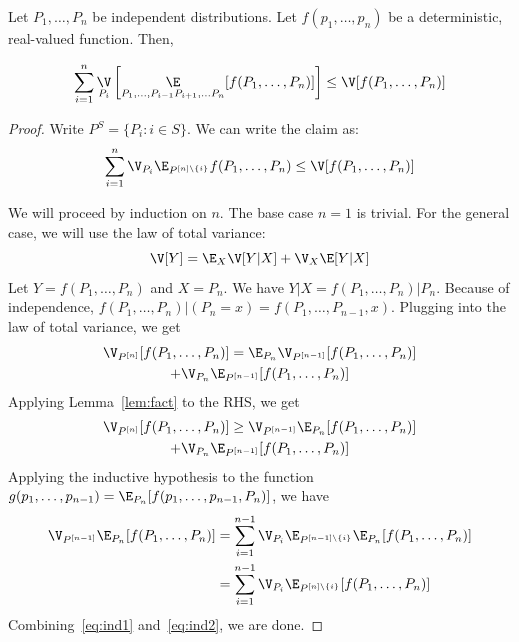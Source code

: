 \begin{lemma}\label{lem:variance-sum}
Let $P_1, \ldots, P_n$ be independent distributions. Let $f(p_1, \ldots, p_n)$
be a deterministic, real-valued function. Then, 

\[
    \sum_{i=1}^n \mathop{\V}_{P_i}\left[ \mathop{\E}_{P_1, \ldots, P_{i-1} P_{i+1}, \ldots P_n} [f(P_1,\ldots, P_n)] \right] \leq \V[f(P_1,\ldots, P_n)]
\]
\end{lemma}
\begin{proof}
Write $P^{S} = \{ P_i : i \in S\}$. We can write the claim as:
\[
    \sum_{i=1}^n \V_{P_i} \E_{P^{[n]\setminus\{i\}}} f(P_1,\ldots, P_n) \leq \V[f(P_1,\ldots, P_n)]
\]

We will proceed by induction on $n$. The base case $n=1$ is trivial. For the general case, we will use the law of total variance:
\[
\V[Y] = \E_X \V[Y | X] + \V_X \E[Y|X]
\]
Let $Y = f(P_1, \ldots, P_n)$ and $X = P_n$. We have $Y | X = f(P_1,\ldots, P_n)|P_n$. Because of independence, $f(P_1,\ldots, P_n)|(P_n=x) = f(P_1,\ldots, P_{n-1},x)$. Plugging into the law of total variance, we get
\begin{multline*}
    \V_{P^{[n]}}[f(P_1, \ldots, P_n)] = \E_{P_n}\V_{P^{[n-1]}}[f(P_1, \ldots,
    P_n)] \\ +  \V_{P_n}\E_{P^{[n-1]}}[f(P_1, \ldots, P_n)]
\end{multline*}
Applying Lemma~\ref{lem:fact} to the RHS, we get
\begin{multline}\label{eq:ind1}
  \V_{P^{[n]}}[f(P_1,\ldots,P_n)] \geq \V_{P^{[n-1]}}\E_{P_n}[f(P_1, \ldots,
  P_n)] \\ + \V_{P_n} \E_{P^{[n-1]}}[f(P_1, \ldots, P_n)]
\end{multline}
Applying the inductive hypothesis to the function $g(p_1, \ldots, p_{n-1}) = \E_{P_n}[f(p_1, \ldots, p_{n-1}, P_n)]$, we have
\begin{align}
\V_{P^{[n-1]}}\E_{P_n}[f(P_1, \ldots, P_n)] &= \sum_{i=1}^{n-1} \V_{P_i} \E_{P^{[n-1]\setminus\{i\}}} \E_{P_n}[f(P_1,\ldots,P_n)] \nonumber \\
&= \sum_{i=1}^{n-1} \V_{P_i} \E_{P^{[n]\setminus\{i\}}} [f(P_1,\ldots,P_n)] \label{eq:ind2}
\end{align}
Combining~\eqref{eq:ind1} and~\eqref{eq:ind2}, we are done.
\end{proof}

